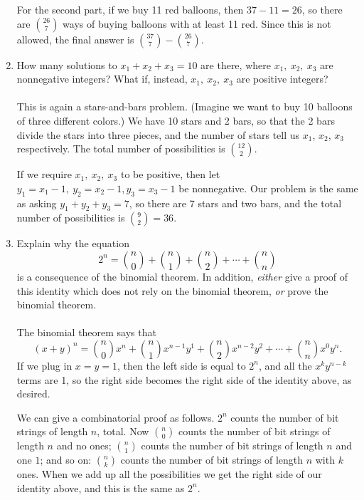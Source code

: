\documentclass[12pt]{article}
\begin{document}
\begin{enumerate}[1.]
For the second part, if we buy 11 red balloons, then $37 - 11 = 26$, so there are ${26 \choose 7}$ ways of buying balloons
with at least 11 red. Since this is not allowed, the final answer is ${37 \choose 7} - {26 \choose 7}$.

\item
How many solutions to $x_1 + x_2 + x_3 = 10$ are there, where $x_1, \ x_2, \ x_3$ are nonnegative integers?
What if, instead, $x_1, \ x_2, \ x_3$ are positive integers?
\\
\\
This is again a stars-and-bars problem. (Imagine we want to buy 10 balloons of three different colors.) We have
10 stars and 2 bars, so that the 2 bars divide the stars into three pieces, and the number of stars tell us $x_1$, $x_2$, $x_3$
respectively. The total number of possibilities is ${12 \choose 2}$.

If we require $x_1, \ x_2, \ x_3$ to be positive, then let $y_1 = x_1 - 1, \ y_2 = x_2 - 1, y_3 = x_3 - 1$ be nonnegative.
Our problem is the same as asking $y_1 + y_2 + y_3 = 7$, so there are 7 stars and two bars, and the total number of possibilities
is ${9 \choose 2} = 36$.

\item
Explain why the equation
$$2^n = {n \choose 0} + {n \choose 1} + {n \choose 2} + \cdots + {n \choose n}$$
is a consequence of the binomial theorem. In addition, {\itshape either} give a proof
of this identity which does not rely on the binomial theorem, {\itshape or} prove the binomial
theorem.
\\
\\
The binomial theorem says that
$$(x + y)^n = {n \choose 0} x^n + {n \choose 1} x^{n - 1} y^1 + {n \choose 2} x^{n - 2} y^2 + \cdots + {n \choose n} x^0 y^n.$$
If we plug in $x = y = 1$, then the left side is equal to $2^n$, and all the $x^k y^{n - k}$ terms are 1, so the right side becomes
the right side of the identity above, as desired.

We can give a combinatorial proof as follows. $2^n$ counts the number of bit strings of length $n$, total. Now ${n \choose 0}$
counts the number of bit strings of length $n$ and no ones; ${n \choose 1}$ counts the number of bit strings of length $n$ and one $1$;
and so on: ${n \choose k}$ counts the number of bit strings of length $n$ with $k$ ones. When we add up all the possibilities we get
the right side of our identity above, and this is the same as $2^n$.


\end{enumerate}
\end{document}
